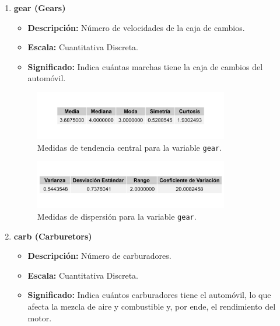 \documentclass{article}
\begin{document}
\begin{enumerate}
    \item \textbf{gear (Gears)}

          \begin{itemize}
              \item \textbf{Descripción:} Número de velocidades de la caja de cambios.
              \item \textbf{Escala:} Cuantitativa Discreta.
              \item \textbf{Significado:} Indica cuántas marchas tiene la caja de cambios del automóvil.
          \end{itemize}

          \begin{figure}[H]
              \centering
              \includegraphics[width=0.8\textwidth]{MTC/gear_central.png}
              \caption{Medidas de tendencia central para la variable \texttt{gear}.}
              \label{fig:gear_central}
          \end{figure}

          \begin{figure}[H]
              \centering
              \includegraphics[width=0.8\textwidth]{MTC/gear_dispersion.png}
              \caption{Medidas de dispersión para la variable \texttt{gear}.}
              \label{fig:gear_dispersion}
          \end{figure}

    \item \textbf{carb (Carburetors)}

          \begin{itemize}
              \item \textbf{Descripción:} Número de carburadores.
              \item \textbf{Escala:} Cuantitativa Discreta.
              \item \textbf{Significado:} Indica cuántos carburadores tiene el automóvil, lo que afecta la mezcla de aire y combustible y, por ende, el rendimiento del motor.
          \end{itemize}


\end{enumerate}
\end{document}
